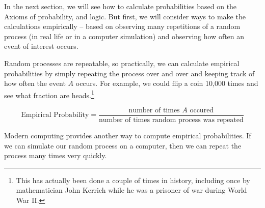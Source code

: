 \documentclass[twoside]{book}\usepackage[]{graphicx}\usepackage[]{xcolor}
\newcounter{example}[section]
\begin{document}
In the next section, we will see how to calculate probabilities based on the Axioms of probability, and logic.  But first, we will consider ways to make the calculations empirically -- based on observing many repetitions of a random process (in real life or in a computer simulation) and observing how often an event of interest occurs.

Random processes are repeatable, so practically, we can calculate empirical probabilities by simply repeating the process
over and over and keeping track of how often the event $A$ occurs.
For example, we could flip a coin 10,000 times and see what fraction 
are heads.\footnote{This has actually been done a couple of times 
in history, including once by mathematician John Kerrich while he was a prisoner of war during World War II.}

\[
\mbox{Empirical Probability} = 
\frac{\mbox{number of times $A$ occured}}
{\mbox{number of times random process was repeated}}
\]

Modern computing provides another way to compute empirical probabilities.
If we can simulate our random process on a computer, then we can 
repeat the process many times very quickly.  
\end{document}
